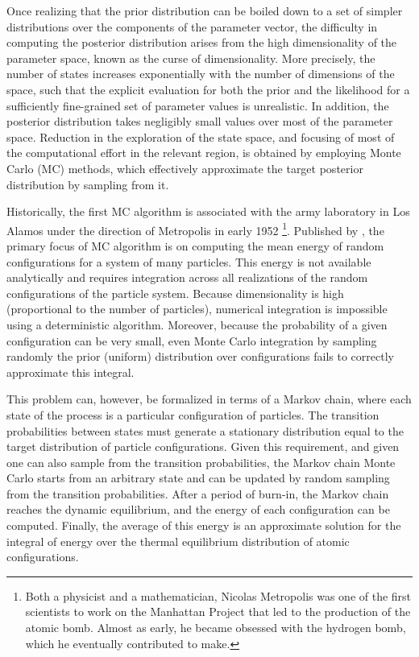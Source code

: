 Once realizing that the \gls{prior} distribution can be boiled down to a set of simpler distributions over the components of the parameter vector, the difficulty in computing the \gls{posterior} distribution arises from the high dimensionality of the parameter space, known as the curse of dimensionality.
More precisely, the number of states increases exponentially with the number of dimensions of the space, such that the explicit evaluation for both the \gls{prior} and the \gls{likelihood} for a sufficiently fine-grained set of parameter values is unrealistic.
In addition, the \gls{posterior} distribution takes negligibly small values over most of the parameter space.
Reduction in the exploration of the state space, and focusing of most of the computational effort in the relevant region, is obtained by employing Monte Carlo (\acrshort{MC}) methods, which effectively approximate the target \gls{posterior} distribution by sampling from it.

Historically, the first \acrshort{MC} algorithm is associated with the army laboratory in Los Alamos under the direction of Metropolis in early 1952
\footnote{Both a physicist and a mathematician, Nicolas Metropolis was one of the first scientists to work on the Manhattan Project that led to the production of the atomic bomb. Almost as early, he became obsessed with the hydrogen bomb, which he eventually contributed to make.}.
Published by \citet{Metropolis1953}, the primary focus of \acrshort{MC} algorithm is on computing the mean energy of random configurations for a system of many particles.
This energy is not available analytically and requires integration across all realizations of the random configurations of the particle system.
Because dimensionality is high (proportional to the number of particles), numerical integration is impossible using a deterministic algorithm.
Moreover, because the probability of a given configuration can be very small, even Monte Carlo integration by sampling randomly the \gls{prior} (uniform) distribution over configurations fails to correctly approximate this integral.

This problem can, however, be formalized in terms of a \gls{Markov chain}, where each state of the process is a particular configuration of particles.
The transition probabilities between states must generate a stationary distribution equal to the target distribution of particle configurations.
Given this requirement, and given one can also sample from the transition probabilities, the \gls{Markov chain Monte Carlo} starts from an arbitrary state and can be updated by random sampling from the transition probabilities.
After a period of burn-in, the \gls{Markov chain} reaches the dynamic equilibrium, and the energy of each configuration can be computed.
Finally, the average of this energy is an approximate solution for the integral of energy over the thermal equilibrium distribution of atomic configurations.

